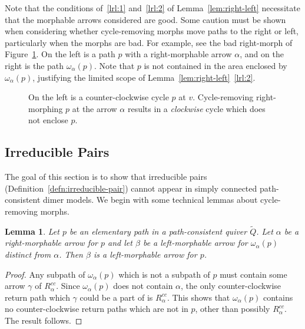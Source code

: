 \documentclass{article}
\newtheorem{lemma}[thm]{Lemma}
\theoremstyle{definition}
\begin{document}
Note that the conditions of~\eqref{lrl:1} and~\eqref{lrl:2} of Lemma~\ref{lem:right-left} necessitate that the morphable arrows considered are good.
Some caution must be shown when considering whether cycle-removing morphs move paths to the right or left, particularly when the morphs are {bad}.
{For example, see the bad right-morph of Figure~\ref{fig:right-creates-counterclockwise}. On the left is a path $p$ with a right-morphable arrow $\alpha$, and on the right is the path $\omega_\alpha(p)$. Note that $p$ is not contained in the area enclosed by $\omega_\alpha(p)$, justifying the limited scope of Lemma~\ref{lem:right-left}~\eqref{lrl:2}.}

\def\svgwidth{200pt}
\begin{figure}[htbp]
    \centering
	
	\caption{On the left is a counter-clockwise cycle $p$ at $v$. Cycle-removing right-morphing $p$ at the arrow $\alpha$ results in a \textit{clockwise} cycle which does not enclose $p$.}
	\label{fig:right-creates-counterclockwise}
\end{figure}

    



\subsection{Irreducible Pairs}

The goal of this section is to show that {irreducible pairs} (Definition~\ref{defn:irreducible-pair}) cannot appear in simply connected path-consistent dimer models. We begin with some technical lemmas about cycle-removing morphs.

\begin{lemma}\label{lem:cycleless-switcheroo}
	Let $p$ be an elementary path in a path-consistent quiver $\widetilde Q$. Let $\alpha$ be a right-morphable arrow for $p$ and let $\beta$ be a left-morphable arrow for $\omega_\alpha(p)$ distinct from $\alpha$. Then $\beta$ is a left-morphable arrow for $p$.
\end{lemma}
\begin{proof}
	Any subpath of $\omega_\alpha(p)$ which is not a subpath of $p$ must contain some arrow $\gamma$ of $R_\alpha^{cc}$. Since $\omega_\alpha(p)$ does not contain $\alpha$, the only counter-clockwise return path which $\gamma$ could be a part of is $R_\alpha^{cc}$. This shows that $\omega_\alpha(p)$ contains no counter-clockwise return paths which are not in $p$, other than possibly $R_\alpha^{cc}$. The result follows.
\end{proof}
\end{document}
